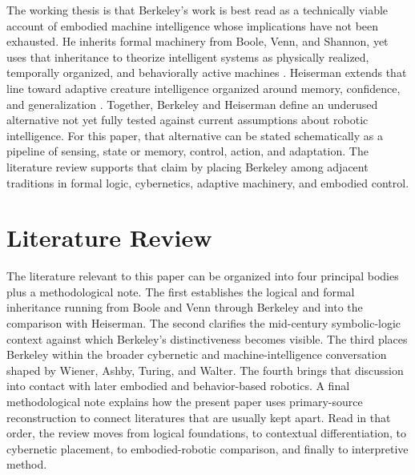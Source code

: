 \documentclass[11pt]{article}
\begin{document}
The working thesis is that Berkeley's work is best read as a technically viable account of embodied machine intelligence whose implications have not been exhausted. He inherits formal machinery from Boole, Venn, and Shannon, yet uses that inheritance to theorize intelligent systems as physically realized, temporally organized, and behaviorally active machines \citep{boole1847mathematical,boole1854laws,venn1894symbolic,shannon1938symbolic}. Heiserman extends that line toward adaptive creature intelligence organized around memory, confidence, and generalization \citep{heiserman1981robot}. Together, Berkeley and Heiserman define an underused alternative not yet fully tested against current assumptions about robotic intelligence. For this paper, that alternative can be stated schematically as a pipeline of sensing, state or memory, control, action, and adaptation. The literature review supports that claim by placing Berkeley among adjacent traditions in formal logic, cybernetics, adaptive machinery, and embodied control.

\section{Literature Review}

The literature relevant to this paper can be organized into four principal bodies plus a methodological note. The first establishes the logical and formal inheritance running from Boole and Venn through Berkeley and into the comparison with Heiserman. The second clarifies the mid-century symbolic-logic context against which Berkeley's distinctiveness becomes visible. The third places Berkeley within the broader cybernetic and machine-intelligence conversation shaped by Wiener, Ashby, Turing, and Walter. The fourth brings that discussion into contact with later embodied and behavior-based robotics. A final methodological note explains how the present paper uses primary-source reconstruction to connect literatures that are usually kept apart. Read in that order, the review moves from logical foundations, to contextual differentiation, to cybernetic placement, to embodied-robotic comparison, and finally to interpretive method.
\end{document}
